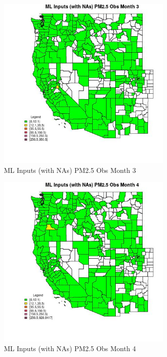 \begin{figure} 
\centering  
\includegraphics[width=0.77\textwidth]{Code_Outputs/Report_ML_input_PM25_Step4_part_e_de_duplicated_aves_compiled_2019-05-21wNAs_CountyPM25_ObsmedianMonth3.jpg} 
\caption{\label{fig:Report_ML_input_PM25_Step4_part_e_de_duplicated_aves_compiled_2019-05-21wNAsCountyPM25_ObsmedianMonth3}ML Inputs (with NAs) PM2.5 Obs Month 3} 
\end{figure} 
 

\begin{figure} 
\centering  
\includegraphics[width=0.77\textwidth]{Code_Outputs/Report_ML_input_PM25_Step4_part_e_de_duplicated_aves_compiled_2019-05-21wNAs_CountyPM25_ObsmedianMonth4.jpg} 
\caption{\label{fig:Report_ML_input_PM25_Step4_part_e_de_duplicated_aves_compiled_2019-05-21wNAsCountyPM25_ObsmedianMonth4}ML Inputs (with NAs) PM2.5 Obs Month 4} 
\end{figure} 
 


